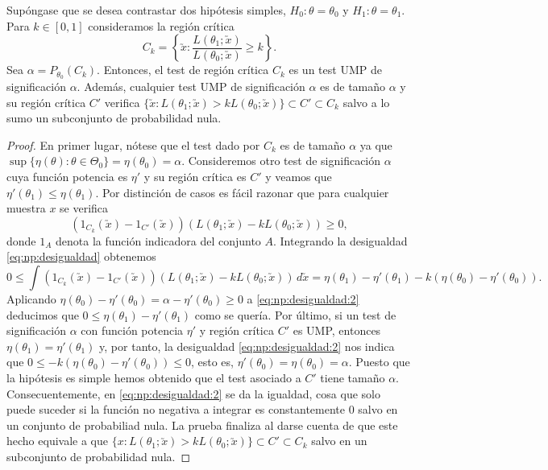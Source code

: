         \begin{thm} \label{thm:np:1}
            Supóngase que se desea contrastar dos hipótesis simples, $H_0 : \theta = \theta_0$ y $H_1 : \theta = \theta_1$. Para $k \in [0,1]$ consideramos la región crítica
            \[C_k = \left\{\utilde{x}: \frac{L(\theta_1;\utilde{x})}{L(\theta_0;\utilde{x})} \ge k\right\}.\]
            Sea $\alpha = P_{\theta_0}(C_k)$. Entonces, el test de región crítica $C_k$ es un test UMP de significación $\alpha$. Además, cualquier test UMP de significación $\alpha$ es de tamaño $\alpha$ y su región crítica $C'$ verifica $\{\utilde{x}: L(\theta_1;\utilde{x}) > k L(\theta_0;\utilde{x})\} \subset C' \subset C_k$ salvo a lo sumo un subconjunto de probabilidad nula.
        \end{thm}
        \begin{proof}
            En primer lugar, nótese que el test dado por $C_k$ es de tamaño $\alpha$ ya que $\sup\{ \eta(\theta) : \theta \in \Theta_0\} = \eta(\theta_0) = \alpha$. Consideremos otro test de significación $\alpha$ cuya función potencia es $\eta'$ y su región crítica es $C'$ y veamos que $\eta'(\theta_1) \le \eta(\theta_1)$. Por distinción de casos es fácil razonar que para cualquier muestra $x$ se verifica
            \begin{equation} \label{eq:np:desigualdad}
                (1_{C_k}(\utilde{x})-1_{C'}(\utilde{x})) (L(\theta_1; \utilde{x}) - k L(\theta_0; \utilde{x})) \ge 0,
            \end{equation}
            donde $1_A$ denota la función indicadora del conjunto $A$. Integrando la desigualdad \eqref{eq:np:desigualdad} obtenemos
            \begin{equation} \label{eq:np:desigualdad:2}
                0 \le \int(1_{C_k}(\utilde{x})-1_{C'}(\utilde{x})) (L(\theta_1; \utilde{x}) - k L(\theta_0; \utilde{x})) \, d\utilde{x} = \eta(\theta_1) - \eta'(\theta_1) - k (\eta(\theta_0) - \eta'(\theta_0)).
            \end{equation}
            Aplicando $\eta(\theta_0) - \eta'(\theta_0) = \alpha  - \eta'(\theta_0) \ge 0$ a \eqref{eq:np:desigualdad:2} deducimos que $0 \le \eta(\theta_1) - \eta'(\theta_1)$ como se quería. Por último, si un test de significación $\alpha$ con función potencia $\eta'$ y región crítica $C'$ es UMP, entonces $\eta(\theta_1) = \eta'(\theta_1)$ y, por tanto, la desigualdad \eqref{eq:np:desigualdad:2} nos indica que $0 \le -k(\eta(\theta_0) - \eta'(\theta_0)) \le 0$, esto es, $\eta'(\theta_0) = \eta(\theta_0) = \alpha$. Puesto que la hipótesis es simple hemos obtenido que el test asociado a $C'$ tiene tamaño $\alpha$. Consecuentemente, en \eqref{eq:np:desigualdad:2} se da la igualdad, cosa que solo puede suceder si la función no negativa a integrar es constantemente 0 salvo en un conjunto de probabiliad nula. La prueba finaliza al darse cuenta de que este hecho equivale a que $\{x: L(\theta_1;\utilde{x}) > k L(\theta_0;\utilde{x})\} \subset C' \subset C_k$ salvo en un subconjunto de probabilidad nula.
        \end{proof}

